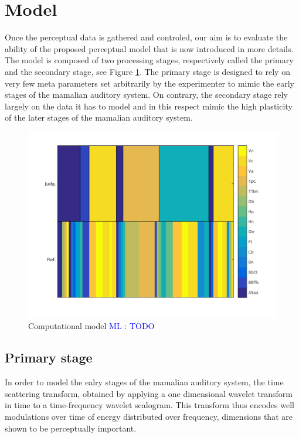 \documentclass{article}
\newcommand{\ml}[1]{\textcolor{blue}{ML : #1}}
\begin{document}
\section{Model}\label{sec:model}

Once the perceptual data is gathered and controled, our aim is to evaluate the ability of the proposed perceptual model that is now introduced in more details. The model is composed of two processing stages, respectively called the primary and the secondary stage, see Figure \ref{fig:model}. The primary stage is designed to rely on very few meta parameters set arbitrarily by the experimenter to mimic the early stages of the mamalian auditory system. On contrary, the secondary stage rely largely on the data it has to model and in this respect mimic the high plasticity of the later stages of the mamalian auditory system.

\begin{figure}
\center
\includegraphics[width = \textwidth]{figures/groupInstruments.png}
\caption{Computational model \ml{TODO}}
\label{fig:model}
\end{figure}

\subsection{Primary stage}

In order to model the ealry stages of the mamalian auditory system, the time scattering transform, obtained by applying a one dimensional
wavelet transform in time to a time-frequency wavelet scalogram. This transform thus encodes well modulations over time of energy distributed over frequency, dimensions that are shown to be perceptually important.
\end{document}
